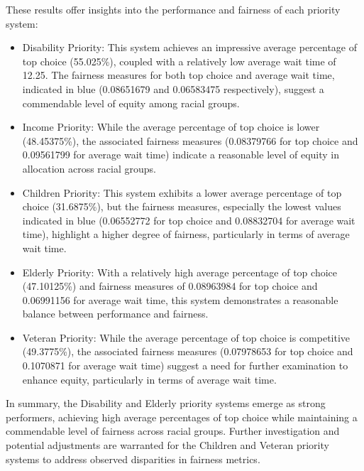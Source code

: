 \documentclass[11pt]{article}
\begin{document}
These results offer insights into the performance and fairness of each priority system:
\begin{itemize}
    \item Disability Priority: This system achieves an impressive average percentage of top choice ({55.025\%}), coupled with a relatively low average wait time of 12.25. The fairness measures for both top choice and average wait time, indicated in blue ({0.08651679} and {0.06583475} respectively), suggest a commendable level of equity among racial groups.
    \item Income Priority: While the average percentage of top choice is lower (48.45375\%), the associated fairness measures (0.08379766 for top choice and 0.09561799 for average wait time) indicate a reasonable level of equity in allocation across racial groups.
    \item Children Priority: This system exhibits a lower average percentage of top choice (31.6875\%), but the fairness measures, especially the lowest values indicated in blue ({0.06552772} for top choice and 0.08832704 for average wait time), highlight a higher degree of fairness, particularly in terms of average wait time.
    \item Elderly Priority: With a relatively high average percentage of top choice (47.10125\%) and fairness measures of 0.08963984 for top choice and 0.06991156 for average wait time, this system demonstrates a reasonable balance between performance and fairness.
    \item Veteran Priority: While the average percentage of top choice is competitive (49.3775\%), the associated fairness measures (0.07978653 for top choice and 0.1070871 for average wait time) suggest a need for further examination to enhance equity, particularly in terms of average wait time.
\end{itemize}
\newline
In summary, the Disability and Elderly priority systems emerge as strong performers, achieving high average percentages of top choice while maintaining a commendable level of fairness across racial groups. Further investigation and potential adjustments are warranted for the Children and Veteran priority systems to address observed disparities in fairness metrics.
\end{document}
